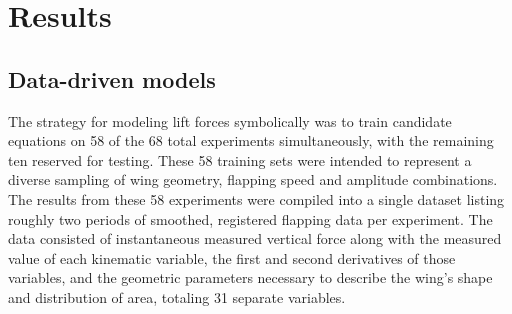 \documentclass{article}
\begin{document}

\section*{Results}

%
%
%
%
%  

\subsection*{Data-driven models}
The strategy for modeling lift forces symbolically was to train candidate
equations on 58 of the 68 total experiments simultaneously, with the remaining
ten reserved for testing.  These 58 training sets were intended to represent a
diverse sampling of wing geometry, flapping speed and amplitude combinations.
The results from these 58 experiments were compiled into a single dataset
listing roughly two periods of smoothed, registered flapping data per
experiment.  The data consisted of instantaneous measured vertical force along
with the measured value of each kinematic variable, the first and second
derivatives of those variables, and the geometric parameters necessary to
describe the wing's shape and distribution of area, totaling 31 separate
variables.
\end{document}
